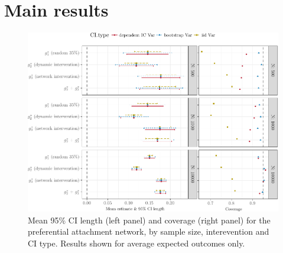 \documentclass[english]{article}\usepackage[]{graphicx}\usepackage[]{color}
\makeatletter
\def\maxwidth{ %
  \ifdim\Gin@nat@width>\linewidth
    \linewidth
  \else
    \Gin@nat@width
  \fi
}
\newenvironment{knitrout}{}{} %
\theoremstyle{plain}
\theoremstyle{plain}
\makeatother
\begin{document}


















\section{Main results}
\begin{knitrout}\footnotesize
{}\color{fgcolor}\begin{figure}

{\centering \includegraphics[width=\maxwidth]{TablesFigs/knitR-CIres_EY_prefattach-1} 

}

\caption[Mean 95\% CI length (left panel) and coverage (right panel) for the preferential attachment network, by sample size, interevention and CI type]{Mean 95\% CI length (left panel) and coverage (right panel) for the preferential attachment network, by sample size, interevention and CI type. Results shown for average expected outcomes only.}\label{fig:CIres.EY.prefattach}
\end{figure}


\end{knitrout}
\end{document}
